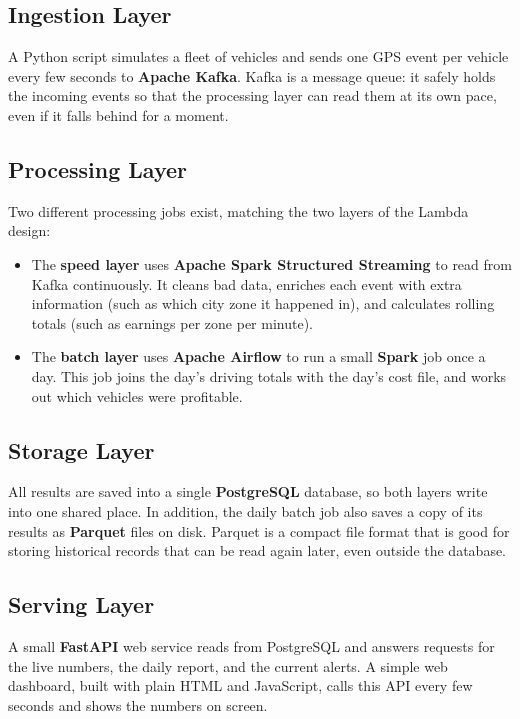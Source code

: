 \documentclass[12pt,a4paper]{article}
\begin{document}
\subsection{Ingestion Layer}
A Python script simulates a fleet of vehicles and sends one GPS event per
vehicle every few seconds to \textbf{Apache Kafka}. Kafka is a message
queue: it safely holds the incoming events so that the processing layer can
read them at its own pace, even if it falls behind for a moment.

\subsection{Processing Layer}
Two different processing jobs exist, matching the two layers of the Lambda
design:
\begin{itemize}
  \item The \textbf{speed layer} uses \textbf{Apache Spark Structured
    Streaming} to read from Kafka continuously. It cleans bad data,
    enriches each event with extra information (such as which city zone it
    happened in), and calculates rolling totals (such as earnings per zone
    per minute).
  \item The \textbf{batch layer} uses \textbf{Apache Airflow} to run a
    small \textbf{Spark} job once a day. This job joins the day's driving
    totals with the day's cost file, and works out which vehicles were
    profitable.
\end{itemize}

\subsection{Storage Layer}
All results are saved into a single \textbf{PostgreSQL} database, so both
layers write into one shared place. In addition, the daily batch job also
saves a copy of its results as \textbf{Parquet} files on disk. Parquet is a
compact file format that is good for storing historical records that can be
read again later, even outside the database.

\subsection{Serving Layer}
A small \textbf{FastAPI} web service reads from PostgreSQL and answers
requests for the live numbers, the daily report, and the current alerts. A
simple web dashboard, built with plain HTML and JavaScript, calls this API
every few seconds and shows the numbers on screen.
\end{document}

